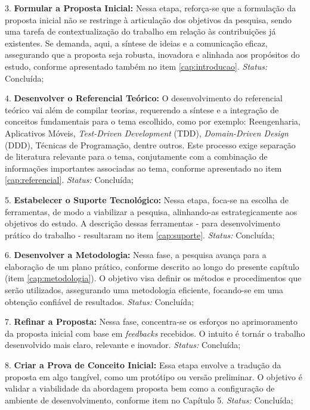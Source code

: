 3. \textbf{Formular a Proposta Inicial:} Nessa etapa, reforça-se que a formulação da proposta inicial não se restringe à articulação dos objetivos 
da pesquisa, sendo uma tarefa de contextualização do trabalho em relação às contribuições já existentes. Se demanda, aqui, a síntese de ideias e a 
comunicação eficaz, assegurando que a proposta seja robusta, inovadora e alinhada aos propósitos do estudo, conforme apresentado também no item \ref{cap:introducao}.
\textit{Status:} Concluída;

4. \textbf{Desenvolver o Referencial Teórico:} O desenvolvimento do referencial teórico vai além de compilar teorias, requerendo a síntese  
e a integração de conceitos fundamentais para o tema escolhido, como por exemplo: Reengenharia, Aplicativos Móveis, \textit{Test-Driven Development} (TDD), 
\textit{Domain-Driven Design} (DDD), Técnicas de Programação, dentre outros. Este processo exige separação de literatura relevante para o tema, conjutamente com a 
combinação de informações importantes associadas ao tema, conforme apresentado no item \ref{cap:referencial}.
\textit{Status:} Concluída;

5. \textbf{Estabelecer o Suporte Tecnológico:} Nessa etapa, foca-se na escolha de ferramentas, de modo a viabilizar a pesquisa, alinhando-as estrategicamente 
aos objetivos do estudo. A descrição dessas ferramentas - para desenvolvimento prático do trabalho - resultaram no item \ref{cap:suporte}.
\textit{Status:} Concluída;

6. \textbf{Desenvolver a Metodologia:} Nessa fase, a pesquisa avança para a elaboração de um plano prático, conforme descrito ao longo do presente capítulo 
(item \ref{cap:metodologia}). O objetivo visa definir os métodos e procedimentos que serão utilizados, assegurando uma metodologia eficiente, focando-se em uma 
obtenção confiável de resultados. 
\textit{Status:} Concluída;

7. \textbf{Refinar a Proposta:} Nessa fase, concentra-se os esforços no aprimoramento da proposta inicial com base em \textit{feedbacks} recebidos. O intuito é 
tornár o trabalho desenvolvido mais claro, relevante e inovador.
\textit{Status:} Concluída;

8. \textbf{Criar a Prova de Conceito Inicial:} Essa etapa envolve a tradução da proposta em algo tangível, como um protótipo ou versão preliminar. O objetivo é 
validar a viabilidade da abordagem proposta bem como a configuração de ambiente de desenvolvimento, conforme item no Capítulo 5.
\textit{Status:} Concluída;

